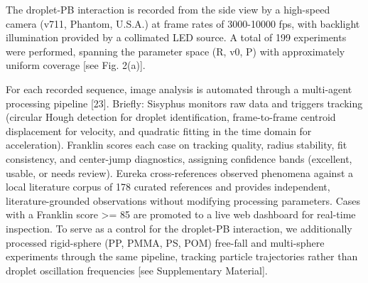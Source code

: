 The droplet-PB interaction is recorded from the side view by a high-speed camera (v711, Phantom, U.S.A.) at frame rates of 3000-10000 fps, with backlight illumination provided by a collimated LED source. A total of 199 experiments were performed, spanning the parameter space (R, v0, P) with approximately uniform coverage [see Fig. 2(a)].

For each recorded sequence, image analysis is automated through a multi-agent processing pipeline [23]. Briefly: Sisyphus monitors raw data and triggers tracking (circular Hough detection for droplet identification, frame-to-frame centroid displacement for velocity, and quadratic fitting in the time domain for acceleration). Franklin scores each case on tracking quality, radius stability, fit consistency, and center-jump diagnostics, assigning confidence bands (excellent, usable, or needs review). Eureka cross-references observed phenomena against a local literature corpus of 178 curated references and provides independent, literature-grounded observations without modifying processing parameters. Cases with a Franklin score >= 85 are promoted to a live web dashboard for real-time inspection. To serve as a control for the droplet-PB interaction, we additionally processed rigid-sphere (PP, PMMA, PS, POM) free-fall and multi-sphere experiments through the same pipeline, tracking particle trajectories rather than droplet oscillation frequencies [see Supplementary Material].